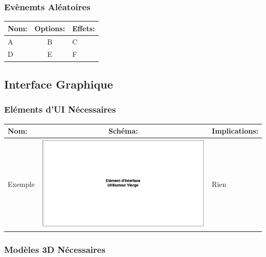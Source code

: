 \documentclass{article}
\begin{document}
        \subsubsection{Evènemts Aléatoires}

            \begin{tabular}{|l|c|l|} \hline
               Nom: & Options: & Effets: \\ \hline\hline
               A & B & C \\
               D & E & F \\ \hline
           \end{tabular} 
    
    \subsection{Interface Graphique}

        \subsubsection{Eléments d'UI Nécessaires}
             
            \begin{tabular}{|l|c|l|} \hline
                Nom: & Schéma: & Implications: \\ \hline \hline
                \begin{turn}{90}Exemple\end{turn} & \includegraphics[scale=0.4]{schema_ui_vierge.png} & Rien\\ \hline
            \end{tabular}
            
        \subsubsection{Modèles 3D Nécessaires}
\end{document}
